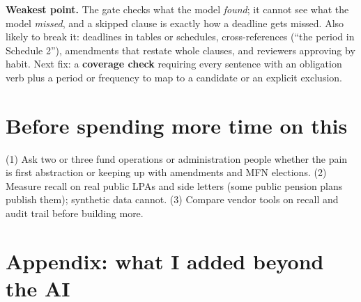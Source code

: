 \documentclass[10pt,a4paper]{article}
\begin{document}
\textbf{Weakest point.} The gate checks what the model \emph{found}; it cannot see what the model \emph{missed}, and a skipped clause is exactly how a deadline gets missed. Also likely to break it: deadlines in tables or schedules, cross-references (``the period in Schedule 2''), amendments that restate whole clauses, and reviewers approving by habit. Next fix: a \textbf{coverage check} requiring every sentence with an obligation verb plus a period or frequency to map to a candidate or an explicit exclusion.

\section{Before spending more time on this}
(1) Ask two or three fund operations or administration people whether the pain is first abstraction or keeping up with amendments and MFN elections. (2) Measure recall on real public LPAs and side letters (some public pension plans publish them); synthetic data cannot. (3) Compare vendor tools on recall and audit trail before building more.

\newpage
\section*{Appendix: what I added beyond the AI}
\end{document}
